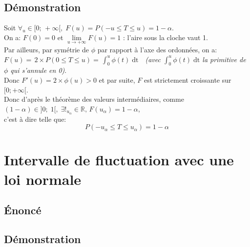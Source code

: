 \documentclass[12px]{article}
\begin{document}
	\subsection{Démonstration}
	Soit $\forall_u\in [0; \, +\infty[,\; F(u) = P(-u\leq T\leq u) = 1-\alpha$.\\
	On a: $F(0)=0$ et $\lim\limits_{u\rightarrow +\infty}F(u)=1$ : l'aire sous la cloche vaut 1.\\
	Par ailleurs, par symétrie de $\phi$ par rapport à l'axe des ordonnées, on a:\\
	$F(u) =\, 2\times P(0\leq T\leq u) =\, \int_{0}^{u}\phi (t)\; \mathrm{dt}$\ \  \emph{(avec $\int_{0}^{u}\phi (t)\; \mathrm{dt}$ la primitive de $\phi$ qui s'annule en 0)}.\\
	Donc $F'(u) = 2\times \phi (u) >0$ et par suite, $F$ est strictement croissante sur $[0; +\infty[$.\\
	Donc d'après le théorème des valeurs intermédiaires, comme $(1-\alpha)\in ]0;\; 1[,\; \exists !_{u_\alpha}\in\mathbb{R},\, F(u_\alpha) = 1-\alpha$,\\
	c'est à dire telle que:
	\begin{displaymath}
		P(-u_\alpha\leq T \leq u_\alpha) = 1-\alpha
	\end{displaymath}
	
	\section{Intervalle de fluctuation avec une loi normale}
	
	\subsection{\'Enoncé}
	
	
	\subsection{Démonstration}
	
	
\end{document}

